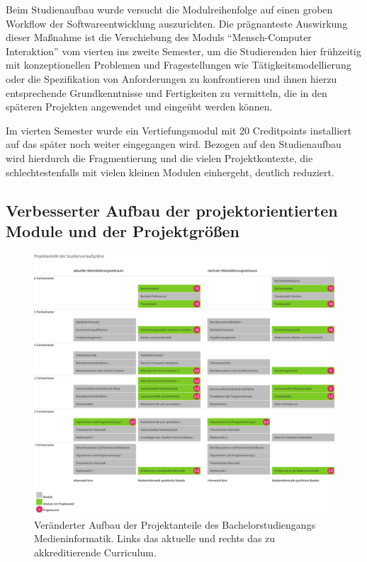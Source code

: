 Beim Studienaufbau wurde versucht die Modulreihenfolge auf einen groben
Workflow der Softwareentwicklung auszurichten. Die prägnanteste
Auswirkung dieser Maßnahme ist die Verschiebung des Moduls
``Mensch-Computer Interaktion'' vom vierten ins zweite Semester, um die
Studierenden hier frühzeitig mit konzeptionellen Problemen und
Fragestellungen wie Tätigkeitsmodellierung oder die Spezifikation von
Anforderungen zu konfrontieren und ihnen hierzu entsprechende
Grundkenntnisse und Fertigkeiten zu vermitteln, die in den späteren
Projekten angewendet und eingeübt werden können.

Im vierten Semester wurde ein Vertiefungsmodul mit 20 Creditpoints
installiert auf das später noch weiter eingegangen wird. Bezogen auf den
Studienaufbau wird hierdurch die Fragmentierung und die vielen
Projektkontexte, die schlechtestenfalls mit vielen kleinen Modulen
einhergeht, deutlich reduziert.

\subsection{Verbesserter Aufbau der projektorientierten Module und
der
Projektgrößen}\label{verbesserter-aufbau-der-projektorientierten-module-und-der-projektgruxf6uxdfen}

\begin{figure}[htbp]
\centering
\includegraphics[width=\columnwidth]{../anhaenge/bilder/ba-projektanteile.png}
\caption{Veränderter Aufbau der Projektanteile des Bachelorstudiengangs
Medieninformatik. Links das aktuelle und rechts das zu akkreditierende
Curriculum.}
\end{figure}

